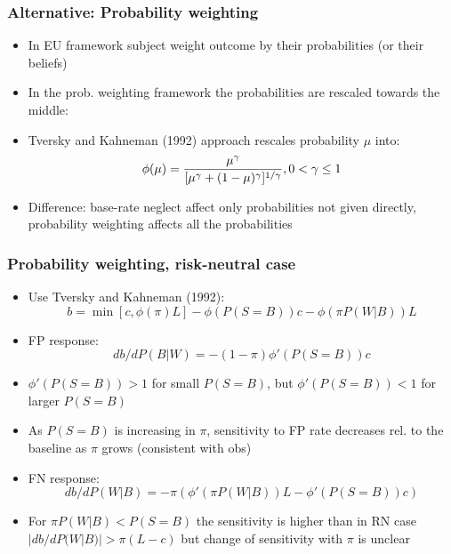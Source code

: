 \documentclass[11pt,hyperref={bookmarks=false}]{beamer}
\begin{document}
\begin{frame}
\frametitle{Alternative: Probability weighting}
\begin{itemize}
\item In EU framework subject weight outcome by their probabilities (or their beliefs)
\item In the prob. weighting framework the probabilities are rescaled towards the middle:
\item Tversky and Kahneman (1992) approach rescales probability $\mu$ into:
$$\phi(\mu)={\mu^{\gamma}\over [\mu^{\gamma}+(1-\mu)^\gamma]^{1/\gamma}}, 0<\gamma\leq 1$$
\item Difference: base-rate neglect affect only probabilities not given directly, probability weighting affects all the probabilities
\end{itemize}
\end{frame}


\begin{frame}
\frametitle{Probability weighting, risk-neutral case}
\begin{itemize}
\small
\item Use Tversky and Kahneman (1992):
$$b=\min[c,\phi(\pi) L]-\phi(P(S=B))c-\phi(\pi P(W|B))L$$
\item FP response:
$$db/dP(B|W)=-(1-\pi)\phi'(P(S=B))c$$
\item $\phi'(P(S=B))>1$ for small $P(S=B)$, but $\phi'(P(S=B))<1$ for larger $P(S=B)$
\item As $P(S=B)$ is increasing in $\pi$, sensitivity to FP rate decreases rel. to the baseline as $\pi$ grows (consistent with obs)
\item FN response:
$$db/dP(W|B)=-\pi (\phi'(\pi P(W|B))L-\phi'(P(S=B))c)$$
\item For $\pi P(W|B)<P(S=B)$ the sensitivity is higher than in RN case $|db/dP(W|B)|>\pi (L-c)$ but change of sensitivity with $\pi$ is unclear
\normalsize
\end{itemize}
\end{frame}
\end{document}
